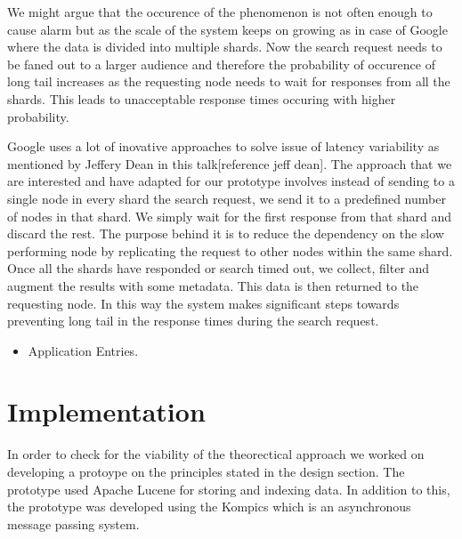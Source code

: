 \documentclass[a4paper, 11pt]{article}
\begin{document}
\par We might argue that the occurence of the phenomenon is not often enough to cause alarm but as the scale of the system keeps on growing as in case of Google where the data is divided into multiple shards. Now the search request needs to be faned out to a larger audience and therefore the probability of occurence of long tail increases as the requesting node needs to wait for responses from all the shards. This leads to unacceptable response times occuring with higher probability. 

\par Google uses a lot of inovative approaches to solve issue of latency variability as mentioned by Jeffery Dean in this talk[reference jeff dean]. The approach that we are interested and have adapted for our prototype involves instead of sending to a single node in every shard the search request, we send it to a predefined number of nodes in that shard. We simply wait for the first response from that shard and discard the rest. The purpose behind it is to reduce the dependency on the slow performing node by replicating the request to other nodes within the same shard. Once all the shards have responded or search timed out, we collect, filter and augment the results with some metadata. This data is then returned to the requesting node. In this way the system makes significant steps towards preventing long tail in the response times during the search request.

\begin{itemize}

\item Application Entries.

\end{itemize}


\section{Implementation}

In order to check for the viability of the theorectical approach we worked on developing a protoype on the principles stated in the design section. The prototype used Apache Lucene for storing and indexing data. In addition to this, the prototype was developed using the Kompics which is an asynchronous message passing system. 
\end{document}
